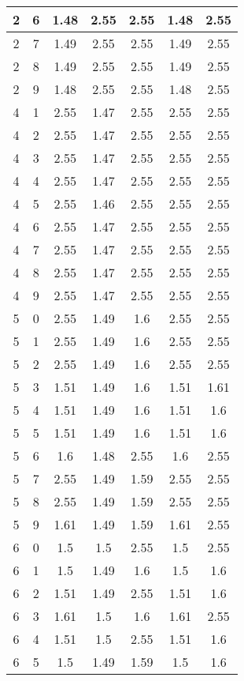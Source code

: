 \begin{longtable}{|c|c||c||c|c||c|c|}
	2 & 6 & 1.48 & 2.55 & 2.55 & 1.48 & 2.55 \\ \hline
	2 & 7 & 1.49 & 2.55 & 2.55 & 1.49 & 2.55 \\ \hline
	2 & 8 & 1.49 & 2.55 & 2.55 & 1.49 & 2.55 \\ \hline
	2 & 9 & 1.48 & 2.55 & 2.55 & 1.48 & 2.55 \\ \hline
	4 & 1 & 2.55 & 1.47 & 2.55 & 2.55 & 2.55 \\ \hline
	4 & 2 & 2.55 & 1.47 & 2.55 & 2.55 & 2.55 \\ \hline
	4 & 3 & 2.55 & 1.47 & 2.55 & 2.55 & 2.55 \\ \hline
	4 & 4 & 2.55 & 1.47 & 2.55 & 2.55 & 2.55 \\ \hline
	4 & 5 & 2.55 & 1.46 & 2.55 & 2.55 & 2.55 \\ \hline
	4 & 6 & 2.55 & 1.47 & 2.55 & 2.55 & 2.55 \\ \hline
	4 & 7 & 2.55 & 1.47 & 2.55 & 2.55 & 2.55 \\ \hline
	4 & 8 & 2.55 & 1.47 & 2.55 & 2.55 & 2.55 \\ \hline
	4 & 9 & 2.55 & 1.47 & 2.55 & 2.55 & 2.55 \\ \hline
	5 & 0 & 2.55 & 1.49 & 1.6 & 2.55 & 2.55 \\ \hline
	5 & 1 & 2.55 & 1.49 & 1.6 & 2.55 & 2.55 \\ \hline
	5 & 2 & 2.55 & 1.49 & 1.6 & 2.55 & 2.55 \\ \hline
	5 & 3 & 1.51 & 1.49 & 1.6 & 1.51 & 1.61 \\ \hline
	5 & 4 & 1.51 & 1.49 & 1.6 & 1.51 & 1.6 \\ \hline
	5 & 5 & 1.51 & 1.49 & 1.6 & 1.51 & 1.6 \\ \hline
	5 & 6 & 1.6 & 1.48 & 2.55 & 1.6 & 2.55 \\ \hline
	5 & 7 & 2.55 & 1.49 & 1.59 & 2.55 & 2.55 \\ \hline
	5 & 8 & 2.55 & 1.49 & 1.59 & 2.55 & 2.55 \\ \hline
	5 & 9 & 1.61 & 1.49 & 1.59 & 1.61 & 2.55 \\ \hline
	6 & 0 & 1.5 & 1.5 & 2.55 & 1.5 & 2.55 \\ \hline
	6 & 1 & 1.5 & 1.49 & 1.6 & 1.5 & 1.6 \\ \hline
	6 & 2 & 1.51 & 1.49 & 2.55 & 1.51 & 1.6 \\ \hline
	6 & 3 & 1.61 & 1.5 & 1.6 & 1.61 & 2.55 \\ \hline
	6 & 4 & 1.51 & 1.5 & 2.55 & 1.51 & 1.6 \\ \hline
	6 & 5 & 1.5 & 1.49 & 1.59 & 1.5 & 1.6 \\ \hline

\end{longtable}
